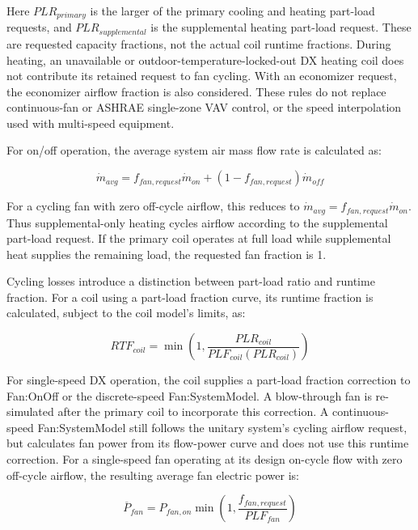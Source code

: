 Here \(PLR_{primary}\) is the larger of the primary cooling and heating part-load requests, and \(PLR_{supplemental}\) is the supplemental heating part-load request. These are requested capacity fractions, not the actual coil runtime fractions. During heating, an unavailable or outdoor-temperature-locked-out DX heating coil does not contribute its retained request to fan cycling. With an economizer request, the economizer airflow fraction is also considered. These rules do not replace continuous-fan or ASHRAE single-zone VAV control, or the speed interpolation used with multi-speed equipment.

For on/off operation, the average system air mass flow rate is calculated as:

\begin{equation}
\dot m_{avg} = f_{fan,request}\dot m_{on} + \left(1-f_{fan,request}\right)\dot m_{off}
\end{equation}

For a cycling fan with zero off-cycle airflow, this reduces to \(\dot m_{avg}=f_{fan,request}\dot m_{on}\). Thus supplemental-only heating cycles airflow according to the supplemental part-load request. If the primary coil operates at full load while supplemental heat supplies the remaining load, the requested fan fraction is 1.

Cycling losses introduce a distinction between part-load ratio and runtime fraction. For a coil using a part-load fraction curve, its runtime fraction is calculated, subject to the coil model's limits, as:

\begin{equation}
RTF_{coil} = \min\left(1,\frac{PLR_{coil}}{PLF_{coil}(PLR_{coil})}\right)
\end{equation}

For single-speed DX operation, the coil supplies a part-load fraction correction to Fan:OnOff or the discrete-speed Fan:SystemModel. A blow-through fan is re-simulated after the primary coil to incorporate this correction. A continuous-speed Fan:SystemModel still follows the unitary system's cycling airflow request, but calculates fan power from its flow-power curve and does not use this runtime correction. For a single-speed fan operating at its design on-cycle flow with zero off-cycle airflow, the resulting average fan electric power is:

\begin{equation}
\overline{P}_{fan} = P_{fan,on}\min\left(1,\frac{f_{fan,request}}{PLF_{fan}}\right)
\end{equation}

